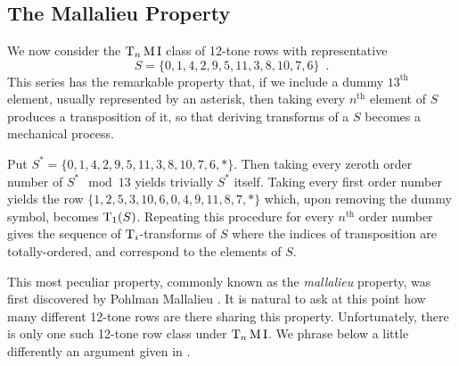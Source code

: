 \chapter{}

\section{The Mallalieu Property}
\label{mallalieu-section}

We now consider the $\operatorname{T}_n\operatorname{M}\operatorname{I}$ class of 12-tone rows with representative
\begin{equation}
	S = \{ 0, 1, 4, 2, 9, 5, 11, 3, 8, 10, 7, 6 \} \enspace.
\end{equation}
This series has the remarkable property that, if we include a dummy $13^\text{th}$ element, usually represented by an asterisk, then taking every $n^\text{th}$ element of $S$ produces a transposition of it, so that deriving transforms of a $S$ becomes a mechanical process.

\begin{example}
	Put $S^* = \{ 0, 1, 4, 2, 9, 5, 11, 3, 8, 10, 7, 6, * \}$. Then taking every zeroth order number of $S^* \mod 13$ yields trivially $S^*$ itself. Taking every first order number yields the row $\{ 1, 2, 5, 3, 10, 6, 0, 4, 9, 11, 8, 7, * \}$ which, upon removing the dummy symbol, becomes $\operatorname{T}_1(S)$. Repeating this procedure for every $n^\text{th}$ order number gives the sequence of $\operatorname{T}_i$-transforms of $S$ where the indices of transposition are totally-ordered, and correspond to the elements of $S$.
\end{example}

This most peculiar property, commonly known as the \emph{mallalieu} property, was first discovered by Pohlman Mallalieu \cite[285]{Lewin1966}. It is natural to ask at this point how many different 12-tone rows are there sharing this property. Unfortunately, there is only one such 12-tone row class under $\operatorname{T}_n\operatorname{M}\operatorname{I}$. We phrase below a little differently an argument given in \cite[17]{Morris1976}.

